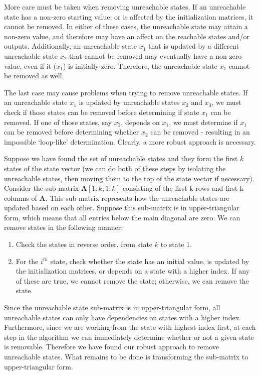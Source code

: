 More care must be taken when removing unreachable states. If an
unreachable state has a non-zero starting value, or is affected by the
initialization matrices, it cannot be removed. In either of these
cases, the unreachable state may attain a non-zero value, and
therefore may have an affect on the reachable states and/or
outputs. Additionally, an unreachable state $x_1$ that is updated by a
different unreachable state $x_2$ that cannot be removed may
eventually have a non-zero value, even if it ($x_1$) is initially
zero. Therefore, the unreachable state $x_1$ cannot be removed as
well.

The last case may cause problems when trying to remove unreachable
states. If an unreachable state $x_1$ is updated by unreachable states
$x_2$ and $x_3$, we must check if those states can be removed before
determining if state $x_1$ can be removed.  If one of those states,
say $x_2$, depends on $x_1$, we must determine if $x_1$ can be removed
before determining whether $x_2$ can be removed - resulting in an
impossible `loop-like' determination. Clearly, a more robust approach
is necessary.

Suppose we have found the set of unreachable states and they form the
first $k$ states of the state vector (we can do both of these steps by
isolating the unreachable states, then moving them to the top of the
state vector if necessary). Consider the sub-matrix
$\mathbf{A}[1:k;1:k]$ consisting of the first k rows and first k
columns of $\mathbf{A}$. This sub-matrix represents how the
unreachable states are updated based on each other.  Suppose this
sub-matrix is in upper-triangular form, which means that all entries
below the main diagonal are zero. We can remove states in the
following manner:
\begin{enumerate}
\vspace{\itemshrink} \item Check the states in reverse order, from state $k$ to state
$1$.

\vspace{\itemshrink} \item For the $i^{th}$ state, check whether the state has an
initial value, is updated by the initialization matrices, or
depends on a state with a higher index. If any of these are true,
we cannot remove the state; otherwise, we can remove the state.
\vspace{\itemshrink} \end{enumerate}

Since the unreachable state sub-matrix is in upper-triangular
form, all unreachable states can only have dependencies on states
with a higher index. Furthermore, since we are working from the
state with highest index first, at each step in the algorithm we
can immediately determine whether or not a given state is
removable. Therefore we have found our robust approach to remove
unreachable states. What remains to be done is transforming the
sub-matrix to upper-triangular form.

